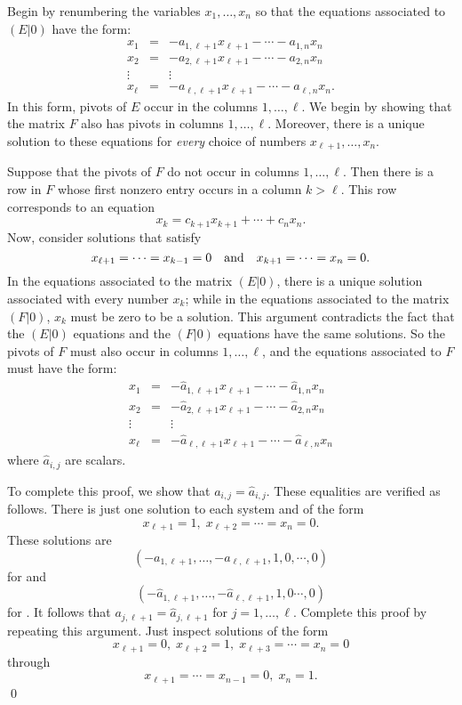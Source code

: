 Begin by renumbering the variables $x_1,\ldots,x_n$ so that the equations 
associated to $(E|0)$ have the form: 
\begin{equation}  \label{e1-ell2a}
\begin{array}{rcl}
  x_1  & = &  - a_{1,\ell+1}x_{\ell+1} - \cdots - a_{1,n}x_n\\
  x_2  & = &  - a_{2,\ell+1}x_{\ell+1} - \cdots - a_{2,n}x_n\\
\vdots &   &    \vdots \\
x_\ell & = &  - a_{\ell,\ell+1}x_{\ell+1} - \cdots - a_{\ell,n}x_n.
\end{array}
\end{equation}
In this form, pivots of $E$ occur in the columns $1,\ldots,\ell$.  We begin 
by showing that the matrix $F$ also has pivots in columns $1,\ldots,\ell$. 
Moreover, there is a unique solution to these equations for {\em every\/}
choice of numbers $x_{\ell+1},\ldots,x_n$.  

Suppose that the pivots of $F$ do not occur in columns $1,\ldots,\ell$.  Then
there is a row in $F$ whose first nonzero entry occurs in a column $k>\ell$. 
This row corresponds to an equation
\[
x_k = c_{k+1}x_{k+1} + \cdots + c_nx_n.
\]
Now, consider solutions that satisfy
\[
x_{\ell+1} = \cdots = x_{k-1} = 0 \quad\mbox{and}\quad x_{k+1} = \cdots = x_n = 0.
\]
In the equations associated to the matrix $(E|0)$, there is a unique solution
associated with every number $x_k$; while in the equations associated to the 
matrix $(F|0)$, $x_k$ must be zero to be a solution.  This argument
contradicts the fact that the $(E|0)$ equations and the $(F|0)$
equations have the same solutions.  So the pivots of $F$ must also occur in 
columns $1,\ldots,\ell$, and the equations associated to $F$ must have the 
form:
\begin{equation} \label{e1-ell2b}
\begin{array}{rcl}
x_1  & = & - \hat{a}_{1,\ell+1}x_{\ell+1} - \cdots - \hat{a}_{1,n}x_n \\
x_2  & = & - \hat{a}_{2,\ell+1}x_{\ell+1} - \cdots - \hat{a}_{2,n}x_n \\
\vdots &   &    \vdots  \\
x_\ell & = & - \hat{a}_{\ell,\ell+1}x_{\ell+1} - \cdots - \hat{a}_{\ell,n}x_n
\end{array}
\end{equation}
where $\hat{a}_{i,j}$ are scalars.

To complete this proof, we show that $a_{i,j}=\hat{a}_{i,j}$.  These 
equalities are verified as follows.  There is just one solution to each 
system  and  of the form
\[
x_{\ell+1}=1,\; x_{\ell+2}=\cdots=x_n=0.
\]
These solutions are
\[
(-a_{1,\ell+1}, \ldots, -a_{\ell,\ell+1},1,0,\cdots,0)
\]
for  and
\[
(-\hat{a}_{1,\ell+1},\ldots,-\hat{a}_{\ell,\ell+1},1,0\cdots,0)
\]
for . It follows that $a_{j,\ell+1}=\hat{a}_{j,\ell+1}$
for $j=1,\ldots,\ell$.  Complete this proof by repeating this argument. 
Just inspect solutions of the form
\[
x_{\ell+1}=0,\; x_{\ell+2}=1,\; x_{\ell+3}=\cdots= x_n=0
\]
through
\[
x_{\ell+1}=\cdots = x_{n-1}=0,\; x_n=1.
\]  \qed




